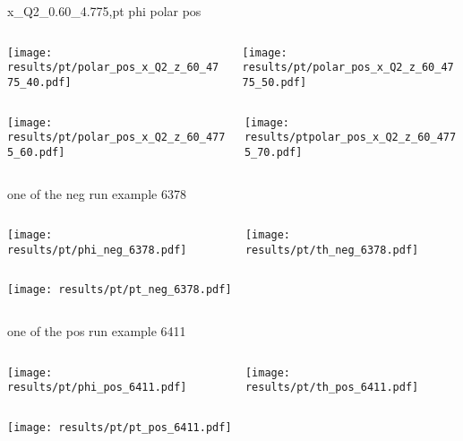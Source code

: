 \begin{frame}{x\_Q2\_0.60\_4.775,pt phi polar pos}
\begin{columns}
\begin{column}[T]{0.5\textwidth}
\texttt{[image: results/pt/polar\_pos\_x\_Q2\_z\_60\_4775\_40.pdf]}
\end{column}
\begin{column}[T]{0.5\textwidth}
\texttt{[image: results/pt/polar\_pos\_x\_Q2\_z\_60\_4775\_50.pdf]}
\end{column}
\end{columns}
\begin{columns}
\begin{column}[T]{0.5\textwidth}
\texttt{[image: results/pt/polar\_pos\_x\_Q2\_z\_60\_4775\_60.pdf]}
\end{column}
\begin{column}[T]{0.5\textwidth}
\texttt{[image: results/ptpolar\_pos\_x\_Q2\_z\_60\_4775\_70.pdf]}
\end{column}
\end{columns}
\end{frame}
\begin{frame}{one of the neg run example 6378}
\begin{columns}
\begin{column}[T]{0.5\textwidth}
\texttt{[image: results/pt/phi\_neg\_6378.pdf]}
\end{column}
\begin{column}[T]{0.5\textwidth}
\texttt{[image: results/pt/th\_neg\_6378.pdf]}
\end{column}
\end{columns}
\begin{columns}
\begin{column}[T]{0.5\textwidth}
\texttt{[image: results/pt/pt\_neg\_6378.pdf]}
\end{column}
\begin{column}[T]{0.5\textwidth}
\end{column}
\end{columns}
\end{frame}
\begin{frame}{one of the pos run example 6411}
\begin{columns}
\begin{column}[T]{0.5\textwidth}
\texttt{[image: results/pt/phi\_pos\_6411.pdf]}
\end{column}
\begin{column}[T]{0.5\textwidth}
\texttt{[image: results/pt/th\_pos\_6411.pdf]}
\end{column}
\end{columns}
\begin{columns}
\begin{column}[T]{0.5\textwidth}
\texttt{[image: results/pt/pt\_pos\_6411.pdf]}
\end{column}
\begin{column}[T]{0.5\textwidth}
\end{column}
\end{columns}
\end{frame}
